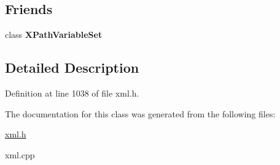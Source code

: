\subsection*{Friends}
\begin{DoxyCompactItemize}
\item 
\hypertarget{classphys_1_1xml_1_1XPathVariable_a6d8e28205e67fa0164160dd3cb547fe6}{
class {\bfseries XPathVariableSet}}
\label{df/dee/classphys_1_1xml_1_1XPathVariable_a6d8e28205e67fa0164160dd3cb547fe6}

\end{DoxyCompactItemize}


\subsection{Detailed Description}


Definition at line 1038 of file xml.h.



The documentation for this class was generated from the following files:\begin{DoxyCompactItemize}
\item 
\hyperlink{xml_8h}{xml.h}\item 
xml.cpp\end{DoxyCompactItemize}
